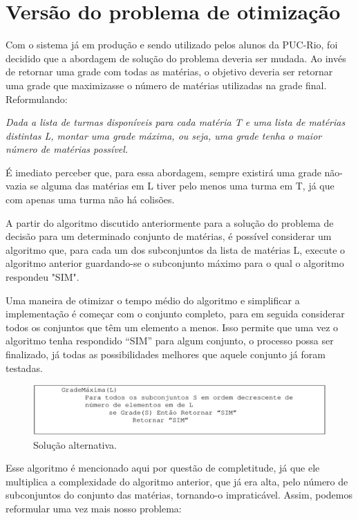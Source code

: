 \documentclass[graduacao,brazil]{ThesisPUC}
\begin{document}
\section{Versão do problema de otimização}

Com o sistema já em produção e sendo utilizado pelos alunos da PUC-Rio, foi decidido que a abordagem de solução do problema deveria ser mudada. Ao invés de retornar uma grade com todas as matérias, o objetivo deveria ser retornar uma grade que maximizasse o número de matérias utilizadas na grade final. Reformulando:

\vspace{3 mm}
\textit{Dada a lista de turmas disponíveis para cada matéria T e uma lista de matérias distintas L, montar uma grade máxima, ou seja, uma grade tenha o maior número de matérias possível.}
\vspace{3 mm}

É imediato perceber que, para essa abordagem, sempre existirá uma grade não-vazia se alguma das matérias em L tiver pelo menos uma turma em T, já que com apenas uma turma não há colisões.

A partir do algoritmo discutido anteriormente para a solução do problema de decisão para um determinado conjunto de matérias, é possível considerar um algoritmo que, para cada um dos subconjuntos da lista de matérias L, execute o algoritmo anterior guardando-se o subconjunto máximo para o qual o algoritmo respondeu "SIM".

Uma maneira de otimizar o tempo médio do algoritmo e simplificar a implementação é começar com o conjunto completo, para em seguida considerar todos os conjuntos que têm um elemento a menos. Isso permite que uma vez o algoritmo tenha respondido “SIM” para algum conjunto, o processo possa ser finalizado, já todas as possibilidades melhores que aquele conjunto já foram testadas.

\begin{figure}[H]
    \centering
    \includegraphics[width=\linewidth]{img/algoritmo_grade_maxima.png}
    \caption{Solução alternativa.}
\end{figure}

Esse algoritmo é mencionado aqui por questão de completitude, já que ele multiplica a complexidade do algoritmo anterior, que já era alta, pelo número de subconjuntos do conjunto das matérias, tornando-o impraticável. Assim, podemos reformular uma vez mais nosso problema:
\end{document}
